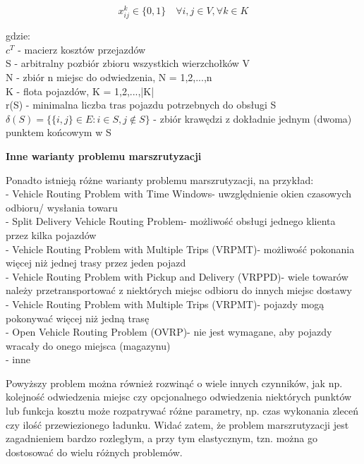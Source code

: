 \documentclass[a4paper, twoside, 12pt, justified]{article}
\begin{document}
	\begin{equation}
	{ x_{ij}^{k} \in \{0,1\} \quad \forall i,j \in V, \forall k \in K }
	\end{equation}
	
	gdzie:\\	
	$c^T$ - macierz kosztów przejazdów\\
	S - arbitralny pozbiór zbioru wszystkich wierzchołków V\\
	N - zbiór n miejsc do odwiedzenia, N = {1,2,...,n}\\
	K - flota pojazdów, K = {1,2,...,|K|}\\
	r(S) - minimalna liczba tras pojazdu potrzebnych do obsługi S\\
	$\delta(S) = \{\{i,j\} \in E : i \in S, j \notin S \}$ - zbiór krawędzi z dokładnie jednym (dwoma) punktem końcowym w S\\
	 
	
	\begin{large}
		\begin{center}
			\textbf{Inne warianty problemu marszrutyzacji}
		\end{center}
	\end{large} 
	
	
	Ponadto istnieją różne warianty problemu marszrutyzacji, na przykład:\\ 
	- Vehicle Routing Problem with Time Windows- uwzględnienie okien czasowych odbioru/ wysłania towaru\\
	- Split Delivery Vehicle Routing Problem- możliwość obsługi jednego klienta przez kilka pojazdów\\
	- Vehicle Routing Problem with Multiple Trips (VRPMT)- możliwość pokonania więcej niż jednej trasy przez jeden pojazd\\
	- Vehicle Routing Problem with Pickup and Delivery (VRPPD)- wiele towarów należy przetransportować z niektórych miejsc odbioru do innych miejsc dostawy\\
	- Vehicle Routing Problem with Multiple Trips (VRPMT)- pojazdy mogą pokonywać więcej niż jedną trasę\\
	- Open Vehicle Routing Problem (OVRP)- nie jest wymagane, aby pojazdy wracały do onego miejsca (magazynu)\\
	- inne
	
	\vspace{5mm} %
	
	Powyższy problem można również rozwinąć o wiele innych czynników, jak np. kolejność odwiedzenia miejsc czy opcjonalnego odwiedzenia niektórych punktów lub funkcja kosztu może rozpatrywać różne parametry, np. czas wykonania zleceń czy ilość przewiezionego ładunku. Widać zatem, że problem marszrutyzacji jest zagadnieniem bardzo rozległym, a przy tym elastycznym, tzn. można go dostosować do wielu różnych problemów.\\
	
\end{document}

